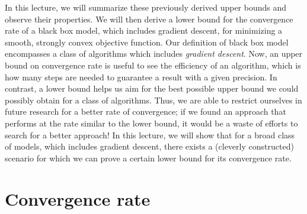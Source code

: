 \documentclass{article}
\begin{document}
In this lecture, we will summarize these previously derived upper bounds and observe their properties.
We will then derive a lower bound for the convergence rate of a black box model, which includes gradient descent, for minimizing a smooth, strongly convex objective function. 
Our definition of black box model encompasses a class of algorithms which includes \emph{gradient descent}.
Now, an upper bound on convergence rate is useful to see the efficiency of an algorithm, which is how many steps are needed to guarantee a result with a given precision. 
In contrast, a lower bound helps us aim for the best possible upper bound we could possibly obtain for a class of algorithms. 
Thus, we are able to restrict ourselves in future research for a better rate of convergence; if we found an approach that performs at the rate similar to the lower bound, it would be a waste of efforts to search for a better approach!
In this lecture, we will show that for a broad class of models, which includes gradient descent, there exists a (cleverly constructed) scenario for which we can prove a certain lower bound for its convergence rate.

\section{Convergence rate}

\end{document}
